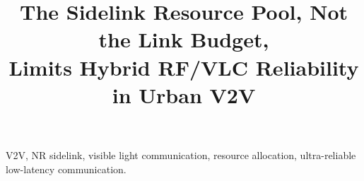 \documentclass[conference]{IEEEtran}
\begin{document}
\title{The Sidelink Resource Pool, Not the Link Budget,\\
       Limits Hybrid RF/VLC Reliability in Urban V2V}

\author{
}

\maketitle

\begin{abstract}
\end{abstract}

\begin{IEEEkeywords}
V2V, NR sidelink, visible light communication, resource allocation,
ultra-reliable low-latency communication.
\end{IEEEkeywords}









\end{document}
